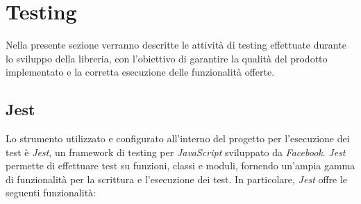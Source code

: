 \section{Testing}
Nella presente sezione verranno descritte le attività di testing effettuate durante lo sviluppo della libreria, con l'obiettivo
di garantire la qualità del prodotto implementato e la corretta esecuzione delle funzionalità offerte.

\subsection{Jest}
Lo strumento utilizzato e configurato all'interno del progetto per l'esecuzione dei test è \textit{Jest}, un framework di testing
per \textit{JavaScript} sviluppato da \textit{Facebook}. \newline
\textit{Jest} permette di effettuare test su funzioni, classi e moduli, fornendo un'ampia gamma di funzionalità per la scrittura e l'esecuzione
dei test. \newline
In particolare, \textit{Jest} offre le seguenti funzionalità:
